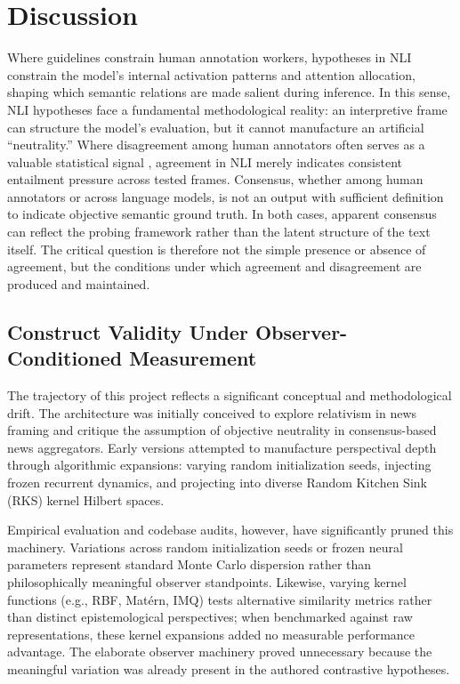 \section{Discussion}

Where guidelines constrain human annotation workers, hypotheses in NLI constrain the model's internal activation patterns and attention allocation, shaping which semantic relations are made salient during inference. In this sense, NLI hypotheses face a fundamental methodological reality: an interpretive frame can structure the model's evaluation, but it cannot manufacture an artificial ``neutrality.'' Where disagreement among human annotators often serves as a valuable statistical signal \citep{aroyo2015, frenda2024}, agreement in NLI merely indicates consistent entailment pressure across tested frames. Consensus, whether among human annotators or across language models, is not an output with sufficient definition to indicate objective semantic ground truth. In both cases, apparent consensus can reflect the probing framework rather than the latent structure of the text itself. The critical question is therefore not the simple presence or absence of agreement, but the conditions under which agreement and disagreement are produced and maintained.

\subsection{Construct Validity Under Observer-Conditioned Measurement}

The trajectory of this project reflects a significant conceptual and methodological drift. The architecture was initially conceived to explore relativism in news framing and critique the assumption of objective neutrality in consensus-based news aggregators. Early versions attempted to manufacture perspectival depth through algorithmic expansions: varying random initialization seeds, injecting frozen recurrent dynamics, and projecting into diverse Random Kitchen Sink (RKS) kernel Hilbert spaces.

Empirical evaluation and codebase audits, however, have significantly pruned this machinery. Variations across random initialization seeds or frozen neural parameters represent standard Monte Carlo dispersion rather than philosophically meaningful observer standpoints. Likewise, varying kernel functions (e.g., RBF, Matérn, IMQ) tests alternative similarity metrics rather than distinct epistemological perspectives; when benchmarked against raw representations, these kernel expansions added no measurable performance advantage. The elaborate observer machinery proved unnecessary because the meaningful variation was already present in the authored contrastive hypotheses.

